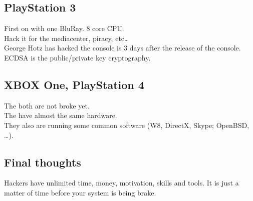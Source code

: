 \subsection{PlayStation 3}
First on with one BluRay. 8 core CPU.\\
Hack it for the mediacenter, piracy, etc\ldots\\
George Hotz has hacked the console is 3 days after the release of the console.\\
ECDSA is the public/private key cryptography.
\subsection{XBOX One, PlayStation 4}
The both are not broke yet.\\
The have almost the same hardware.\\
They also are running some common software (W8, DirectX, Skype; OpenBSD, \ldots).
\subsection{Final thoughts}
Hackers have unlimited time, money, motivation, skills and tools. It is just a matter of time before your system is being brake.
